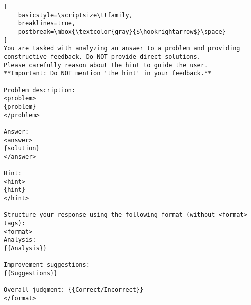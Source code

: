 \begin{table}[h!]
\begin{tcolorbox}[
    colback=gray!5,
    colframe=gray!75,
    title=Prompt Template for Execution-guided Critique Generation,
    fonttitle=\bfseries
]
\begin{lstlisting}[
    basicstyle=\scriptsize\ttfamily,
    breaklines=true,
    postbreak=\mbox{\textcolor{gray}{$\hookrightarrow$}\space}
]
You are tasked with analyzing an answer to a problem and providing constructive feedback. Do NOT provide direct solutions.
Please carefully reason about the hint to guide the user.
**Important: Do NOT mention 'the hint' in your feedback.**

Problem description:
<problem>
{problem}
</problem>

Answer:
<answer>
{solution}
</answer>

Hint:
<hint>
{hint}
</hint>

Structure your response using the following format (without <format> tags):
<format>
Analysis:
{{Analysis}}

Improvement suggestions:
{{Suggestions}}

Overall judgment: {{Correct/Incorrect}}
</format>
\end{lstlisting}
\end{tcolorbox}
\end{table}


